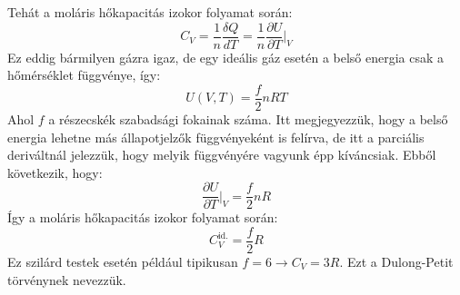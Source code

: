 \documentclass[a4paper,12pt]{article}
\begin{document}
Tehát a moláris hőkapacitás izokor folyamat során:
\begin{equation}
    C_V = \frac{1}{n} \frac{\delta Q}{dT} = \frac{1}{n} \frac{\partial U}{\partial T}\bigg|_{V}
\end{equation}
Ez eddig bármilyen gázra igaz, de egy ideális gáz esetén a belső energia csak a hőmérséklet függvénye, így:
\begin{equation}
    U(V, T) = \frac{f}{2} n R T
\end{equation}
Ahol $f$ a részecskék szabadsági fokainak száma. Itt megjegyezzük, hogy a belső energia lehetne más állapotjelzők függvényeként is felírva, de itt a parciális
deriváltnál jelezzük, hogy melyik függvényére vagyunk épp kíváncsiak. Ebből következik, hogy:
\begin{equation}
    \frac{\partial U}{\partial T}\bigg|_{V} = \frac{f}{2} n R
\end{equation}
Így a moláris hőkapacitás izokor folyamat során:
\begin{equation}
    C^{\text{id.}}_V = \frac{f}{2} R
\end{equation}
Ez szilárd testek esetén például tipikusan $f = 6 \to C_V = 3R$. Ezt a Dulong-Petit törvénynek nevezzük.
\end{document}
